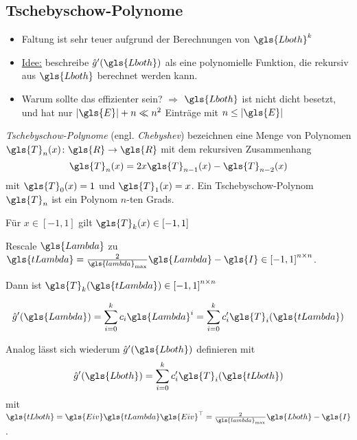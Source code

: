 \subsection{Tschebyschow-Polynome}

\begin{itemize}
  \item Faltung ist sehr teuer aufgrund der Berechnungen von $\gls{Lboth}^k$
  \item \underline{Idee:} beschreibe $\hat g^{\prime}\left(\gls{Lboth}\right)$ als eine polynomielle Funktion, die rekursiv aus $\gls{Lboth}$ berechnet werden kann.
  \item Warum sollte das effizienter sein? $\Rightarrow$ $\gls{Lboth}$ ist nicht dicht besetzt, und hat nur $\left|\gls{E}\right| + n \ll n^2$ Einträge mit $n \leq \left|\gls{E}\right|$
\end{itemize}

\emph{Tschebyschow-Polynome} (engl. \emph{Chebyshev}) bezeichnen eine Menge von Polynomen $\gls{T}_n\left(x\right) \colon \gls{R} \to \gls{R}$ mit dem rekursiven Zusammenhang
\begin{equation}
  \gls{T}_n\left(x\right) = 2x \gls{T}_{n-1}\left(x\right) - \gls{T}_{n-2}\left(x\right)
\end{equation}
mit $\gls{T}_0\left(x\right) = 1$ und $\gls{T}_1\left(x\right) = x$.
Ein Tschebyschow-Polynom $\gls{T}_n$ ist ein Polynom $n$-ten Grads.

Für $x \in \left[-1, 1\right]$ gilt $\gls{T}_k\left(x\right) \in \left[-1, 1\right]$

Rescale $\gls{Lambda}$ zu $\gls{tLambda} = \frac{2}{\gls{lambda}_{\max}} \gls{Lambda} - \gls{I} \in {\left[-1, 1\right]}^{n \times n}$.

Dann ist $\gls{T}_k\left(\gls{tLambda}\right) \in {\left[-1, 1\right]}^{n \times n}$

\begin{equation}
  \hat g^{\prime}\left(\gls{Lambda}\right) = \sum_{i=0}^k c_i \gls{Lambda}^i = \sum_{i = 0}^k c^{\prime}_i \gls{T}_i \left(\gls{tLambda}\right)
\end{equation}

Analog lässt sich wiederum $\hat g^{\prime}\left(\gls{Lboth}\right)$ definieren mit
\begin{equation}
  \hat g^{\prime}\left(\gls{Lboth}\right) = \sum_{i=0}^k c^{\prime}_i \gls{T}_i\left(\gls{tLboth}\right)
\end{equation}
mit $\gls{tLboth} = \gls{Eiv}\gls{tLambda}\gls{Eiv}^{\top} = \frac{2}{\gls{lambda}_{\max}} \gls{Lboth} - \gls{I}$.

